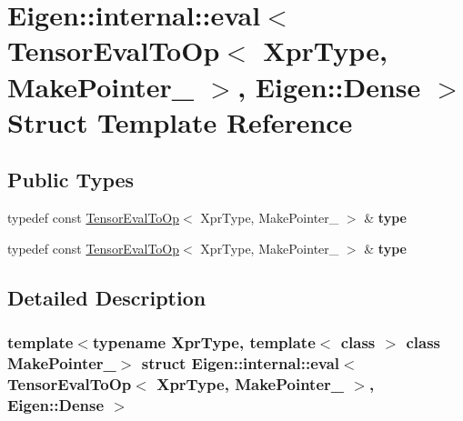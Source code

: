 \hypertarget{struct_eigen_1_1internal_1_1eval_3_01_tensor_eval_to_op_3_01_xpr_type_00_01_make_pointer___01_4_00_01_eigen_1_1_dense_01_4}{}\section{Eigen\+:\+:internal\+:\+:eval$<$ Tensor\+Eval\+To\+Op$<$ Xpr\+Type, Make\+Pointer\+\_\+ $>$, Eigen\+:\+:Dense $>$ Struct Template Reference}
\label{struct_eigen_1_1internal_1_1eval_3_01_tensor_eval_to_op_3_01_xpr_type_00_01_make_pointer___01_4_00_01_eigen_1_1_dense_01_4}
\subsection*{Public Types}
\begin{DoxyCompactItemize}
\item 
\mbox{\label{struct_eigen_1_1internal_1_1eval_3_01_tensor_eval_to_op_3_01_xpr_type_00_01_make_pointer___01_4_00_01_eigen_1_1_dense_01_4_a4e0c7cd58bcbcb7c79b15dcef3a077bd}} 
typedef const \hyperlink{class_eigen_1_1_tensor_eval_to_op}{Tensor\+Eval\+To\+Op}$<$ Xpr\+Type, Make\+Pointer\+\_\+ $>$ \& {\bfseries type}
\item 
\mbox{\label{struct_eigen_1_1internal_1_1eval_3_01_tensor_eval_to_op_3_01_xpr_type_00_01_make_pointer___01_4_00_01_eigen_1_1_dense_01_4_a4e0c7cd58bcbcb7c79b15dcef3a077bd}} 
typedef const \hyperlink{class_eigen_1_1_tensor_eval_to_op}{Tensor\+Eval\+To\+Op}$<$ Xpr\+Type, Make\+Pointer\+\_\+ $>$ \& {\bfseries type}
\end{DoxyCompactItemize}


\subsection{Detailed Description}
\subsubsection*{template$<$typename Xpr\+Type, template$<$ class $>$ class Make\+Pointer\+\_\+$>$\newline
struct Eigen\+::internal\+::eval$<$ Tensor\+Eval\+To\+Op$<$ Xpr\+Type, Make\+Pointer\+\_\+ $>$, Eigen\+::\+Dense $>$}



